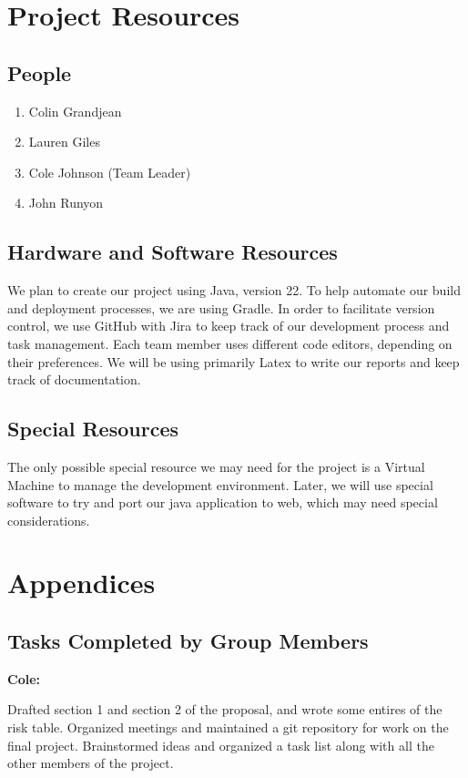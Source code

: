 \documentclass[english,12pt]{article}
\begin{document}
\section{Project Resources}

\subsection{People}
\begin{enumerate}
  \item Colin Grandjean 
  \item Lauren Giles   
  \item Cole Johnson (Team Leader)
  \item John Runyon    
\end{enumerate}
\subsection{Hardware and Software Resources}
We plan to create our project using Java, version 22. 
To help automate our build and deployment processes, we are using Gradle. 
In order to facilitate version control, we use GitHub with Jira to keep track of our 
development process and task management. Each team member uses different 
code editors, depending on their preferences. We will be using primarily Latex to
write our reports and keep track of documentation.

\subsection{Special Resources}
The only possible special resource we may need for the project is a Virtual Machine 
to manage the development environment. Later, we will use
special software to try and port our java application to web, which may need
special considerations.
\section{Appendices}  

\subsection{Tasks Completed by Group Members}

\textbf{Cole:}

Drafted section 1 and section 2 of the proposal, and wrote some entires of the risk table.
Organized meetings and maintained a git repository for work on the final project. 
Brainstormed ideas and organized a task list along with all the other members
of the project.
\end{document}
